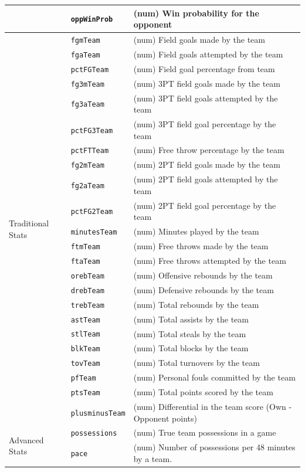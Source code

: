 \documentclass [MS] {uclathes}
\begin{document}
\begin{longtable}{@{}lll@{}}
 & \texttt{oppWinProb} & (num) Win probability for the opponent \\* \midrule
\multirow[t]{23}{*}{Traditional Stats} & \texttt{fgmTeam} & (num) Field goals made by the team \\
 & \texttt{fgaTeam} & (num) Field goals attempted by the team \\
 & \texttt{pctFGTeam} & (num) Field goal percentage from team \\
 & \texttt{fg3mTeam} & (num) 3PT field goals made by the team \\
 & \texttt{fg3aTeam} & (num) 3PT field goals attempted by the team \\
 & \texttt{pctFG3Team} & (num) 3PT field goal percentage by the team \\
 & \texttt{pctFTTeam} & (num) Free throw percentage by the team \\
 & \texttt{fg2mTeam} & (num) 2PT field goals made by the team \\
 & \texttt{fg2aTeam} & (num) 2PT field goals attempted by the team \\
 & \texttt{pctFG2Team} & (num) 2PT field goal percentage by the team \\
 & \texttt{minutesTeam} & (num) Minutes played by the team \\
 & \texttt{ftmTeam} & (num) Free throws made by the team \\
 & \texttt{ftaTeam} & (num) Free throws attempted by the team \\
 & \texttt{orebTeam} & (num) Offensive rebounds by the team \\
 & \texttt{drebTeam} & (num) Defensive rebounds by the team \\
 & \texttt{trebTeam} & (num) Total rebounds by the team \\
 & \texttt{astTeam} & (num) Total assists by the team \\
 & \texttt{stlTeam} & (num) Total steals by the team \\
 & \texttt{blkTeam} & (num) Total blocks by the team \\
 & \texttt{tovTeam} & (num) Total turnovers by the team \\
 & \texttt{pfTeam} & (num) Personal fouls committed by the team \\
 & \texttt{ptsTeam} & (num) Total points scored by the team \\
 & \texttt{plusminusTeam} & (num) Differential in the team score (Own - Opponent points) \\* \midrule
\multirow[t]{2}{*}{Advanced Stats} & \texttt{possessions} & (num) True team possessions in a game \\
 & \texttt{pace} & (num) Number of possessions per 48 minutes by a team. \\* \bottomrule
 \end{longtable}
\end{document}
